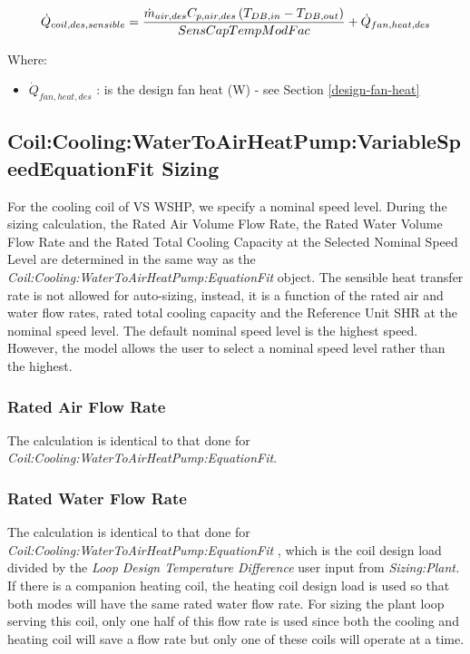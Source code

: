 \begin{equation}
  \dot{Q}_{coil,des,sensible} = \frac{\dot{m}_{air,des}C_{p,air,des}\left(T_{DB,in}-T_{DB,out}\right)}{SensCapTempModFac} +\dot{Q}_{fan,heat,des}
\end{equation}

Where:

\begin{itemize}
\item
  \(\dot{Q}_{fan,heat,des}\) : is the design fan heat (W) - see Section \ref{design-fan-heat}
\end{itemize}

\subsection{Coil:Cooling:WaterToAirHeatPump:VariableSpeedEquationFit Sizing}\label{coilcoolingwatertoairheatpumpvariablespeedequationfit-sizing}

For the cooling coil of VS WSHP, we specify a nominal speed level. During the sizing calculation, the Rated Air Volume Flow Rate, the Rated Water Volume Flow Rate and the Rated Total Cooling Capacity at the Selected Nominal Speed Level are determined in the same way as the \emph{Coil:Cooling:WaterToAirHeatPump:EquationFit} object. The sensible heat transfer rate is not allowed for auto-sizing, instead, it is a function of the rated air and water flow rates, rated total cooling capacity and the Reference Unit SHR at the nominal speed level. The default nominal speed level is the highest speed. However, the model allows the user to select a nominal speed level rather than the highest.

\subsubsection{Rated Air Flow Rate}\label{rated-air-flow-rate-1}

The calculation is identical to that done for \emph{Coil:Cooling:WaterToAirHeatPump:EquationFit}.

\subsubsection{Rated Water Flow Rate}\label{rated-water-flow-rate-1}

The calculation is identical to that done for \emph{Coil:Cooling:WaterToAirHeatPump:EquationFit} , which is the coil design load divided by the \emph{Loop Design Temperature Difference} user input from \emph{Sizing:Plant.} If there is a companion heating coil, the heating coil design load is used so that both modes will have the same rated water flow rate. For sizing the plant loop serving this coil, only one half of this flow rate is used since both the cooling and heating coil will save a flow rate but only one of these coils will operate at a time.

